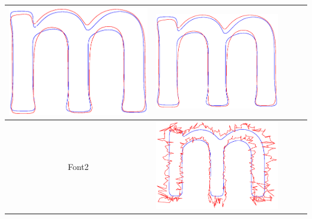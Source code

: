 \documentclass[12pt]{article}
\begin{document}
\begin{center}
\begin{table}[h]
\begin{tabular}{|c|c|c|c|c|}
\includegraphics[scale = 0.2]{images/f1var0_1} &
\includegraphics[scale = 0.2]{images/f1var0_01} \\ \hline
Font2 & 
\includegraphics[scale = 0.2]{images/f2var10} &

\end{tabular}
\end{table}
\end{center}
\end{document}
